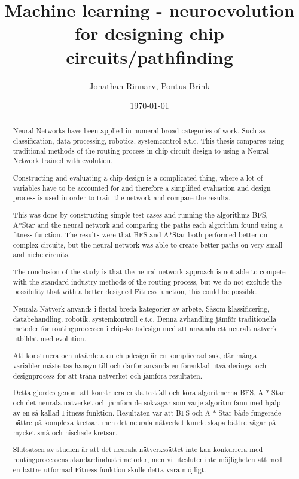 \documentclass{kththesis}
\title{Machine learning - neuroevolution for designing chip circuits/pathfinding}
\author{Jonathan Rinnarv, Pontus Brink}
\date{\today}
\begin{document}
 
\frontmatter
 
\titlepage
 
\begin{abstract}
Neural Networks have been applied in numeral broad categories of work. Such as classification, data processing, robotics, systemcontrol e.t.c. This thesis compares using traditional methods of the routing process in chip circuit design to using a Neural Network trained with evolution.
 
Constructing and evaluating a chip design is a complicated thing, where a lot of variables have to be accounted for and therefore a simplified evaluation and design process is used in order to train the network and compare the results. 
 
This was done by constructing simple test cases and running the algorithms BFS, A*Star and the neural network and comparing the paths each algorithm found using a fitness function. The results were that BFS and A*Star both performed better on complex circuits, but the neural network was able to create better paths on very small and niche circuits. 
 
The conclusion of the study is that the neural network approach is not able to compete with the standard industry methods of the routing process, but we do not exclude the possibility that with a better designed Fitness function, this could be possible.
\end{abstract}
 
 
\begin{otherlanguage}{swedish}
  \begin{abstract}
   Neurala Nätverk används i flertal breda kategorier av arbete. Såsom klassificering, databehandling, robotik, systemkontroll e.t.c. Denna avhandling jämför traditionella metoder för routingprocessen i chip-kretsdesign med att använda ett neuralt nätverk utbildat med evolution.
 
Att konstruera och utvärdera en chipdesign är en komplicerad sak, där många variabler måste tas hänsyn till och därför används en förenklad utvärderings- och designprocess för att träna nätverket och jämföra resultaten.
 
Detta gjordes genom att konstruera enkla testfall och köra algoritmerna BFS, A * Star och det neurala nätverket och jämföra de sökvägar som varje algoritm fann med hjälp av en så kallad Fitness-funktion. Resultaten var att BFS och A * Star både fungerade bättre på komplexa kretsar, men det neurala nätverket kunde skapa bättre vägar på mycket små och nischade kretsar.
 
 
Slutsatsen av studien är att det neurala nätverkssättet inte kan konkurrera med routingprocessens standardindustrimetoder, men vi utesluter inte möjligheten att med en bättre utformad Fitness-funktion skulle detta vara möjligt.
  \end{abstract}
\end{otherlanguage}
 
\end{document}
